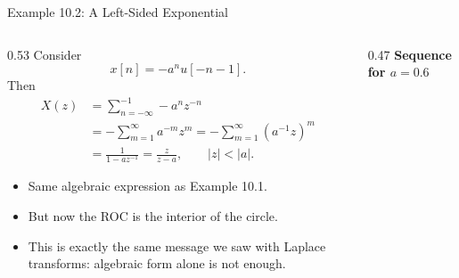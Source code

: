 \begin{frame}[t]{Example 10.2: A Left-Sided Exponential}
  \footnotesize
  \begin{columns}[T]
    \begin{column}{0.53\textwidth}
      Consider
      \[
        x[n] = -a^n u[-n-1].
      \]
      Then
      \begin{align*}
        X(z)
        &= \sum_{n=-\infty}^{-1} -a^n z^{-n} \\
        &= -\sum_{m=1}^{\infty} a^{-m} z^m
        = -\sum_{m=1}^{\infty} (a^{-1}z)^m \\
        &= \frac{1}{1-az^{-1}}
        = \frac{z}{z-a},
        \qquad |z|<|a|.
      \end{align*}

      \begin{itemize}
        \item Same algebraic expression as Example 10.1.
        \item But now the ROC is the interior of the circle.
        \item This is exactly the same message we saw with Laplace transforms:
          algebraic form alone is not enough.
      \end{itemize}
    \end{column}
    \begin{column}{0.47\textwidth}
      \textbf{Sequence for $a=0.6$}\\[-0.05cm]
      \begin{center}
      \end{center}


\end{column}
\end{columns}
\end{frame}

